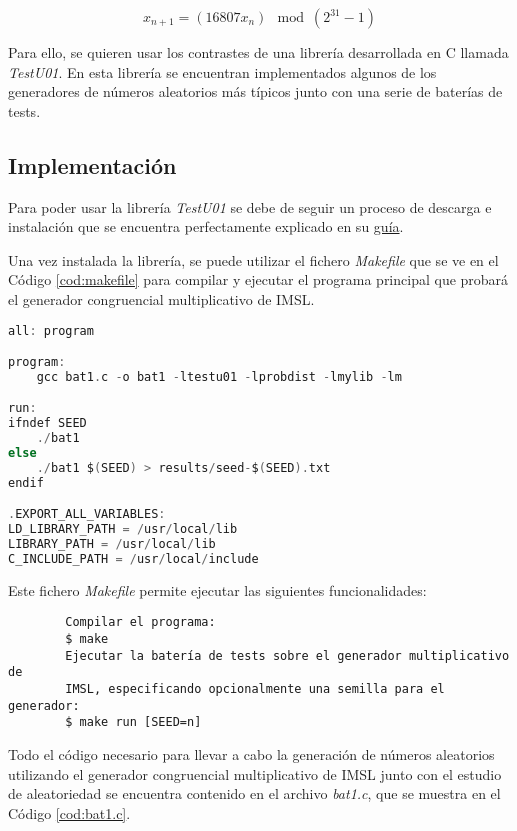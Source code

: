 \documentclass{article}
\begin{document}
\begin{equation*}
    x_{n+1} = (16807x_n) \mod (2^{31}-1)
\end{equation*}

Para ello, se quieren usar los contrastes de una librería desarrollada en C llamada \emph{TestU01}. En esta librería se encuentran implementados algunos de los generadores de números aleatorios más típicos junto con una serie de baterías de tests. 

\subsection{Implementación}

Para poder usar la librería \emph{TestU01} se debe de seguir un proceso de descarga e instalación que se encuentra perfectamente explicado en su \href{http://simul.iro.umontreal.ca/testu01/install.html}{guía}.

Una vez instalada la librería, se puede utilizar el fichero \emph{Makefile} que se ve en el Código \ref{cod:makefile} para compilar y ejecutar el programa principal que probará el generador congruencial multiplicativo de IMSL.

\begin{lstlisting}[language=C, escapechar=¿, caption={Makefile del programa}, label={cod:makefile}]
all: program

program:
    gcc bat1.c -o bat1 -ltestu01 -lprobdist -lmylib -lm

run:
ifndef SEED
    ./bat1
else
    ./bat1 $(SEED) > results/seed-$(SEED).txt
endif

.EXPORT_ALL_VARIABLES:
LD_LIBRARY_PATH = /usr/local/lib
LIBRARY_PATH = /usr/local/lib
C_INCLUDE_PATH = /usr/local/include
\end{lstlisting}

Este fichero \emph{Makefile} permite ejecutar las siguientes funcionalidades:

\begin{commandline}
	\begin{verbatim}
        Compilar el programa:
		$ make
        Ejecutar la batería de tests sobre el generador multiplicativo de
        IMSL, especificando opcionalmente una semilla para el generador:
		$ make run [SEED=n]
	\end{verbatim}
\end{commandline}

Todo el código necesario para llevar a cabo la generación de números aleatorios utilizando el generador congruencial multiplicativo de IMSL junto con el estudio de aleatoriedad se encuentra contenido en el archivo \emph{bat1.c}, que se muestra en el Código \ref{cod:bat1.c}.
\end{document}
